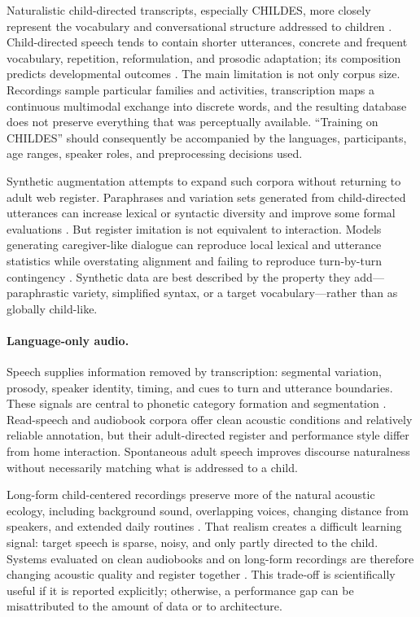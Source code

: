 Naturalistic child-directed transcripts, especially CHILDES, more closely represent the vocabulary and conversational structure addressed to children \citep{macwhinney_childes_2000}. Child-directed speech tends to contain shorter utterances, concrete and frequent vocabulary, repetition, reformulation, and prosodic adaptation; its composition predicts developmental outcomes \citep{WeislederFernald2013}. The main limitation is not only corpus size. Recordings sample particular families and activities, transcription maps a continuous multimodal exchange into discrete words, and the resulting database does not preserve everything that was perceptually available. ``Training on CHILDES'' should consequently be accompanied by the languages, participants, age ranges, speaker roles, and preprocessing decisions used.

Synthetic augmentation attempts to expand such corpora without returning to adult web register. Paraphrases and variation sets generated from child-directed utterances can increase lexical or syntactic diversity and improve some formal evaluations \citep{haga2024babylm}. But register imitation is not equivalent to interaction. Models generating caregiver-like dialogue can reproduce local lexical and utterance statistics while overstating alignment and failing to reproduce turn-by-turn contingency \citep{LiuFourtassi2024}. Synthetic data are best described by the property they add---paraphrastic variety, simplified syntax, or a target vocabulary---rather than as globally child-like.

\paragraph{Language-only audio.}
Speech supplies information removed by transcription: segmental variation, prosody, speaker identity, timing, and cues to turn and utterance boundaries. These signals are central to phonetic category formation and segmentation \citep{Kuhl2006,Saffran1996}. Read-speech and audiobook corpora offer clean acoustic conditions and relatively reliable annotation, but their adult-directed register and performance style differ from home interaction. Spontaneous adult speech improves discourse naturalness without necessarily matching what is addressed to a child.

Long-form child-centered recordings preserve more of the natural acoustic ecology, including background sound, overlapping voices, changing distance from speakers, and extended daily routines \citep{cristia2020accuracy,bergelson2023everyday}. That realism creates a difficult learning signal: target speech is sparse, noisy, and only partly directed to the child. Systems evaluated on clean audiobooks and on long-form recordings are therefore changing acoustic quality and register together \citep{lavechin2024modeling}. This trade-off is scientifically useful if it is reported explicitly; otherwise, a performance gap can be misattributed to the amount of data or to architecture.

